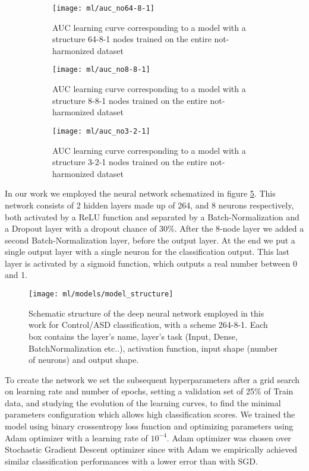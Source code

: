 \documentclass[11pt]{report}
\begin{document}
\begin{figure}
\centering
\begin{subfigure}[b]{0.3\textwidth}
   \texttt{[image: ml/auc\_no64-8-1]}
   \caption{AUC learning curve corresponding to a model with a structure 64-8-1 nodes trained on the entire not-harmonized dataset}
   \label{fig:auc_no64-8-1}
\end{subfigure}
\begin{subfigure}[b]{0.3\textwidth}
   \texttt{[image: ml/auc\_no8-8-1]}
   \caption{AUC learning curve corresponding to a model with a structure 8-8-1 nodes trained on the entire not-harmonized dataset}
   \label{fig:auc_no8-8-1}
\end{subfigure}
\begin{subfigure}[b]{0.3\textwidth}
   \texttt{[image: ml/auc\_no3-2-1]}
   \caption{AUC learning curve corresponding to a model with a structure 3-2-1 nodes trained on the entire not-harmonized dataset}
   \label{fig:auc_no3-2-1}
\end{subfigure}
\caption{}
\label{fig:learningcurve}
\end{figure}


In our work we employed the neural network schematized in figure \ref{fig:model_structure}.
This network consists of 2 hidden layers made up of 264, and 8 neurons respectively, both activated by a ReLU function and separated by a Batch-Normalization and a Dropout layer with a dropout chance of 30\%.
After the 8-node layer we added a second Batch-Normalization layer, before the output layer.
At the end we put a single output layer with a single neuron for the classification output.
This last layer is activated by a sigmoid function, which outputs a real number between 0 and 1.



\begin{figure}[h!]
\centering
\texttt{[image: ml/models/model\_structure]}
\caption{Schematic structure of the deep neural network employed in this work for Control/ASD classification, with a scheme 264-8-1.
Each box contains the layer's name, layer's task (Input, Dense, BatchNormalization etc..), activation function, input shape (number of neurons) and output shape.}
\label{fig:model_structure}
\end{figure}


To create the network we set the subsequent hyperparameters after a grid search on learning rate and number of epochs, setting a validation set of 25\% of Train data, and studying the evolution of the learning curves, to find the minimal parameters configuration which allows high classification scores.
We trained the model using binary crossentropy loss function and optimizing parameters using Adam optimizer with a learning rate of $10^{-4}$.
Adam optimizer was chosen over Stochastic Gradient Descent optimizer since with Adam we empirically achieved similar classification performances with a lower error than with SGD.
\end{document}
